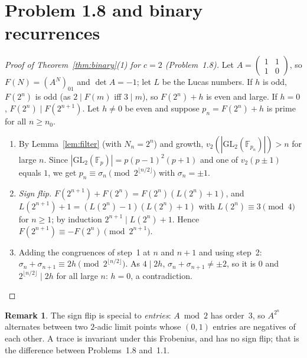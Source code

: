 \documentclass[11pt]{amsart}
\theoremstyle{definition}
\newtheorem{remark}[theorem]{Remark}
\newcommand{\F}{\mathbb{F}}
\newcommand{\GL}{\mathrm{GL}}
\newcommand{\floor}[1]{\lfloor #1 \rfloor}
\begin{document}
\section{Problem 1.8 and binary recurrences}\label{sec:binary}

\begin{proof}[Proof of Theorem~\ref{thm:binary}(1) for $c=2$ (Problem~1.8)]
Let $A=\left(\begin{smallmatrix}1&1\\1&0\end{smallmatrix}\right)$, so $F(N)=(A^N)_{01}$ and $\det A=-1$; let $L$ be the Lucas numbers.
If $h$ is odd, $F(2^n)$ is odd (as $2\mid F(m)$ iff $3\mid m$), so $F(2^n)+h$ is even and large.  If $h=0$, $F(2^n)\mid F(2^{n+1})$.  Let $h\neq0$ be even and suppose $p_n=F(2^n)+h$ is prime for all $n\ge n_0$.
\begin{enumerate}
\item By Lemma~\ref{lem:filter} (with $N_n=2^n$) and growth, $v_2(|\GL_2(\F_{p_n})|)>n$ for large $n$.  Since $|\GL_2(\F_p)|=p(p-1)^2(p+1)$ and one of $v_2(p\pm1)$ equals $1$, we get $p_n\equiv\sigma_n\pmod{2^{\floor{n/2}}}$ with $\sigma_n=\pm1$.
\item \emph{Sign flip.}  $F(2^{n+1})+F(2^n)=F(2^n)(L(2^n)+1)$, and $L(2^{n+1})+1=(L(2^n)-1)(L(2^n)+1)$ with $L(2^n)\equiv3\pmod 4$ for $n\ge1$; by induction $2^{n+1}\mid L(2^n)+1$.  Hence $F(2^{n+1})\equiv-F(2^n)\pmod{2^{n+1}}$.
\item Adding the congruences of step~1 at $n$ and $n+1$ and using step~2: $\sigma_n+\sigma_{n+1}\equiv 2h\pmod{2^{\floor{n/2}}}$.  As $4\mid 2h$, $\sigma_n+\sigma_{n+1}\neq\pm2$, so it is $0$ and $2^{\floor{n/2}}\mid 2h$ for all large $n$: $h=0$, a contradiction. \qedhere
\end{enumerate}
\end{proof}

\begin{remark}
The sign flip is special to \emph{entries}: $A\bmod2$ has order~$3$, so $A^{2^n}$ alternates between two $2$-adic limit points whose $(0,1)$ entries are negatives of each other.  A trace is invariant under this Frobenius, and has no sign flip; that is the difference between Problems~1.8 and~1.1.
\end{remark}
\end{document}
